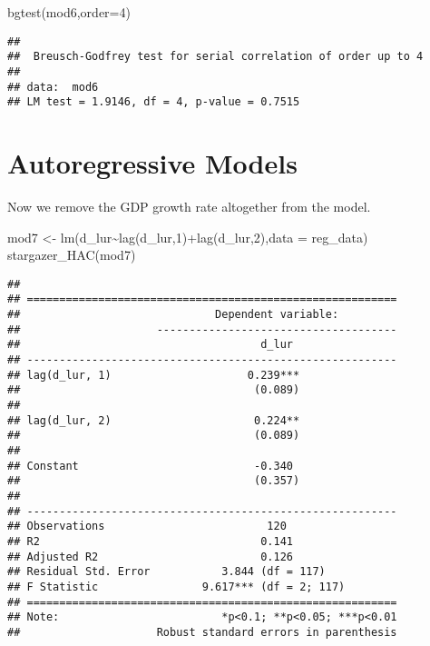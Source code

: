\documentclass[
]{article}
\newenvironment{Shaded}{\begin{snugshade}}{\end{snugshade}}
\newcommand{\AttributeTok}[1]{\textcolor[rgb]{0.77,0.63,0.00}{#1}}
\newcommand{\DecValTok}[1]{\textcolor[rgb]{0.00,0.00,0.81}{#1}}
\newcommand{\FunctionTok}[1]{\textcolor[rgb]{0.00,0.00,0.00}{#1}}
\newcommand{\NormalTok}[1]{#1}
\newcommand{\OtherTok}[1]{\textcolor[rgb]{0.56,0.35,0.01}{#1}}
\newcommand{\SpecialCharTok}[1]{\textcolor[rgb]{0.00,0.00,0.00}{#1}}
\begin{document}
\begin{Shaded}
\begin{Highlighting}[]
\FunctionTok{bgtest}\NormalTok{(mod6,}\AttributeTok{order=}\DecValTok{4}\NormalTok{)}
\end{Highlighting}
\end{Shaded}

\begin{verbatim}
## 
##  Breusch-Godfrey test for serial correlation of order up to 4
## 
## data:  mod6
## LM test = 1.9146, df = 4, p-value = 0.7515
\end{verbatim}

\hypertarget{autoregressive-models}{%
\section{Autoregressive Models}\label{autoregressive-models}}

Now we remove the GDP growth rate altogether from the model.

\begin{Shaded}
\begin{Highlighting}[]
\NormalTok{mod7 }\OtherTok{\textless{}{-}} \FunctionTok{lm}\NormalTok{(d\_lur}\SpecialCharTok{\textasciitilde{}}\FunctionTok{lag}\NormalTok{(d\_lur,}\DecValTok{1}\NormalTok{)}\SpecialCharTok{+}\FunctionTok{lag}\NormalTok{(d\_lur,}\DecValTok{2}\NormalTok{),}\AttributeTok{data =}\NormalTok{ reg\_data)}
\FunctionTok{stargazer\_HAC}\NormalTok{(mod7)}
\end{Highlighting}
\end{Shaded}

\begin{verbatim}
## 
## =========================================================
##                              Dependent variable:         
##                     -------------------------------------
##                                     d_lur                
## ---------------------------------------------------------
## lag(d_lur, 1)                     0.239***               
##                                    (0.089)               
##                                                          
## lag(d_lur, 2)                      0.224**               
##                                    (0.089)               
##                                                          
## Constant                           -0.340                
##                                    (0.357)               
##                                                          
## ---------------------------------------------------------
## Observations                         120                 
## R2                                  0.141                
## Adjusted R2                         0.126                
## Residual Std. Error           3.844 (df = 117)           
## F Statistic                9.617*** (df = 2; 117)        
## =========================================================
## Note:                         *p<0.1; **p<0.05; ***p<0.01
##                     Robust standard errors in parenthesis
\end{verbatim}
\end{document}
